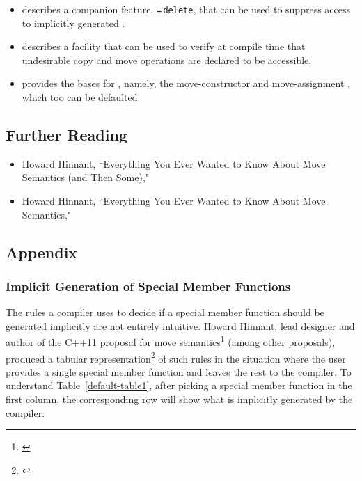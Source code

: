 {\begin{itemize}
\item{describes a companion feature, \lstinline!=!\,\lstinline!delete!, that can be used to suppress access to implicitly generated .}
\item{describes a facility that can be used to verify at compile time that undesirable copy and move operations are declared to be accessible.}
\item{provides the bases for , namely, the move-constructor and move-assignment , which too can be defaulted.}
\end{itemize}

\subsection[Further Reading]{Further Reading}\label{further-reading}

\begin{itemize}
\item{Howard Hinnant, ``Everything You Ever Wanted to Know About Move Semantics (and Then Some)," \cite{hinnant14}}
\item{Howard Hinnant, ``Everything You Ever Wanted to Know About Move Semantics," \cite{hinnant16}}
\end{itemize}

\subsection[Appendix]{Appendix}\label{appendix-default}

\subsubsection[Implicit Generation of Special Member Functions]{Implicit Generation of Special Member Functions}\label{implicit-generation-of-special-member-functions}

The rules a compiler uses to decide if a special member function
should be generated implicitly are not entirely intuitive. Howard
Hinnant, lead designer and author of the C++11 proposal for move
semantics\footnote{\cite{hinnant02}} (among other proposals), produced a tabular representation\footnote{\cite{hinnant16}} of
such rules in the situation where the user provides a single special
member function and leaves the rest to the compiler. To understand Table~\ref{default-table1}, after picking a special member function in the first
column, the corresponding row will show what is implicitly generated by
the compiler.

}
